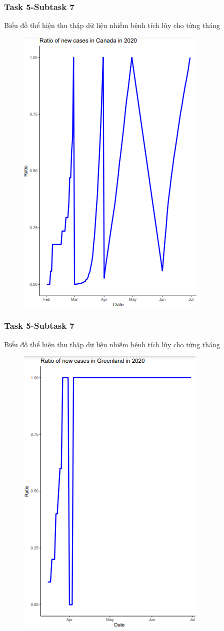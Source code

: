 \documentclass[english,10pt,table]{beamer}
\begin{document}
{
    \frametitle{Task 5-Subtask 7}
    \begin{block}{Biểu đồ thể hiện thu thập dữ liệu nhiễm bệnh tích lũy cho từng tháng}
    \begin{figure}[H]
		\centering
		\includegraphics[scale=0.5]{images/5.7.1.png}
	\end{figure}
    \end{block}
}
\frame
{
    \frametitle{Task 5-Subtask 7}
    \begin{block}{Biểu đồ thể hiện thu thập dữ liệu nhiễm bệnh tích lũy cho từng tháng}
    \begin{figure}[H]
		\centering
		\includegraphics[scale=0.5]{images/5.7.2.png}
	\end{figure}
    \end{block}
}
\end{document}
